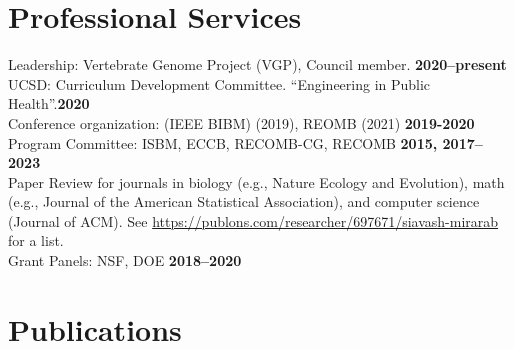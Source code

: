 \documentclass[margin,line,letterpaper]{resume}
\begin{document}
\begin{resume}
    \section{\mysidestyle Professional Services}
    Leadership: Vertebrate Genome Project (VGP), Council member.   \hfill \textbf{2020--present}\vspace{1mm}\\
    UCSD: Curriculum Development Committee. ``Engineering in Public Health''.\hfill \textbf{2020}\vspace{1mm} \\
     Conference organization: (IEEE BIBM) (2019), REOMB (2021)   \hfill \textbf{2019-2020}\vspace{1mm}\\
    Program Committee: ISBM, ECCB, RECOMB-CG, RECOMB  \hfill \textbf{2015, 2017--2023}\vspace{1mm}\\
    Paper Review for journals in biology (e.g.,  Nature Ecology and Evolution), math (e.g., Journal of the American Statistical Association), and computer science (Journal of ACM). See \url{https://publons.com/researcher/697671/siavash-mirarab} for a list.\\
Grant Panels:  NSF, DOE  \hfill \textbf{2018--2020}








    \renewcommand*{\thefootnote}{\fnsymbol{footnote}}
    \section{\mysidestyle Publications}


\end{resume}
\end{document}
